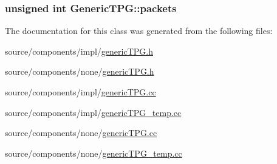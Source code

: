 \hypertarget{classGenericTPG_373e1e2904c42be961f521c8b32e9f1e}{
\subsubsection[{packets}]{\setlength{\rightskip}{0pt plus 5cm}unsigned int {\bf GenericTPG::packets}}}
\label{classGenericTPG_373e1e2904c42be961f521c8b32e9f1e}




The documentation for this class was generated from the following files:\begin{CompactItemize}
\item 
source/components/impl/\hyperlink{impl_2genericTPG_8h}{genericTPG.h}\item 
source/components/none/\hyperlink{none_2genericTPG_8h}{genericTPG.h}\item 
source/components/impl/\hyperlink{impl_2genericTPG_8cc}{genericTPG.cc}\item 
source/components/impl/\hyperlink{impl_2genericTPG__temp_8cc}{genericTPG\_\-temp.cc}\item 
source/components/none/\hyperlink{none_2genericTPG_8cc}{genericTPG.cc}\item 
source/components/none/\hyperlink{none_2genericTPG__temp_8cc}{genericTPG\_\-temp.cc}\end{CompactItemize}
